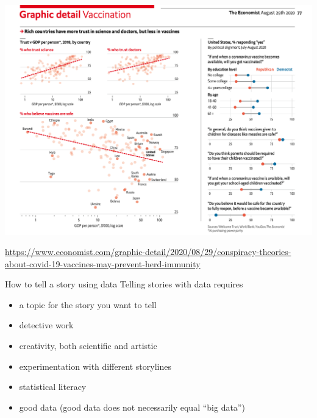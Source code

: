 \documentclass[table]{beamer}\usepackage[]{graphicx}\usepackage[]{color}
\begin{document}
%
%
%
%
%
%
%



\begin{frame}

\centering

\includegraphics[width=\textwidth]{figure-static/graphic-detail-vaccination.png}

\tiny \url{https://www.economist.com/graphic-detail/2020/08/29/conspiracy-theories-about-covid-19-vaccines-may-prevent-herd-immunity}

\end{frame}



\begin{frame}{How to tell a story using data}
Telling stories with data requires
\begin{itemize}
    \item a topic for the story you want to tell
    \item detective work
    \item creativity, both scientific and artistic
    \item experimentation with different storylines
    \item statistical literacy
    \item good data (good data does not necessarily equal ``big data'')
\end{itemize}

\end{frame}
\end{document}

